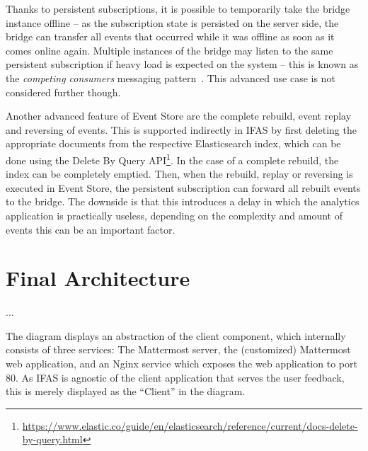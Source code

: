 Thanks to persistent subscriptions, it is possible to temporarily take the bridge instance offline -- as the subscription state is persisted on the server side, the bridge can transfer all events that occurred while it was offline as soon as it comes online again.
Multiple instances of the bridge may listen to the same persistent subscription if heavy load is expected on the system -- this is known as the \emph{competing consumers} messaging pattern~\cite{WEB:Microsoft-Competing-Consumers}.
This advanced use case is not considered further though.


Another advanced feature of Event Store are the complete rebuild, event replay and reversing of events.
This is supported indirectly in \ac{IFAS} by first deleting the appropriate documents from the respective Elasticsearch index, which can be done using the Delete By Query API\footnote{\url{https://www.elastic.co/guide/en/elasticsearch/reference/current/docs-delete-by-query.html}}.
In the case of a complete rebuild, the index can be completely emptied.
Then, when the rebuild, replay or reversing is executed in Event Store, the persistent subscription can forward all rebuilt events to the bridge.
The downside is that this introduces a delay in which the analytics application is practically useless, depending on the complexity and amount of events this can be an important factor.

\section{Final Architecture}

...


The diagram displays an abstraction of the client component, which internally consists of three services:
The Mattermost server, the (customized) Mattermost web application, and an Nginx service which exposes the web application to port 80.
As \ac{IFAS} is agnostic of the client application that serves the user feedback, this is merely displayed as the ``Client'' in the diagram.

